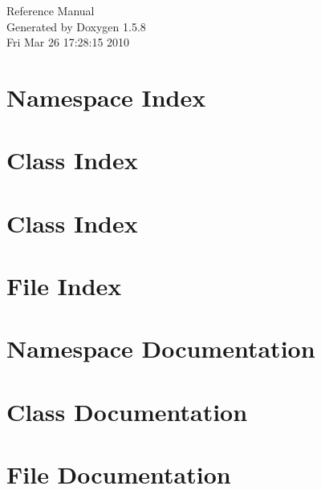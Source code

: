 \documentclass[a4paper]{book}
\begin{document}
\begin{titlepage}
\vspace*{7cm}
\begin{center}
{\Large Reference Manual}\\
\vspace*{1cm}
{\large Generated by Doxygen 1.5.8}\\
\vspace*{0.5cm}
{\small Fri Mar 26 17:28:15 2010}\\
\end{center}
\end{titlepage}
\clearemptydoublepage
{}
\tableofcontents
\clearemptydoublepage
{}
\chapter{Namespace Index}

\chapter{Class Index}

\chapter{Class Index}

\chapter{File Index}

\chapter{Namespace Documentation}

\chapter{Class Documentation}





















\chapter{File Documentation}








\printindex
\end{document}
